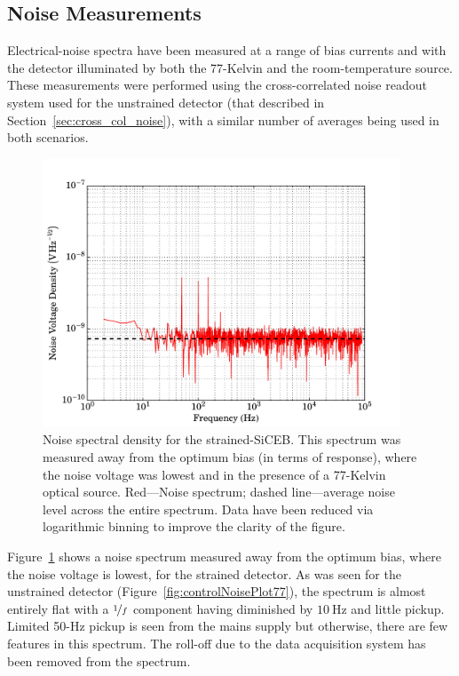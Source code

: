 \subsection{Noise Measurements}\label{ssec:opticalStrainedSi_noise}
Electrical-noise spectra have been measured at a range of bias currents and with the detector illuminated by both the 77-Kelvin and the room-temperature source. These measurements were performed using the cross-correlated noise readout system used for the unstrained detector (that described in Section~\ref{sec:cross_col_noise}), with a similar number of averages being used in both scenarios.
\begin{figure}[tb]
\begin{center}
\includegraphics[width = 0.95\textwidth]{figures/strained_noisePlot77}
\caption[Noise spectrum for the strained-SiCEB]{Noise spectral density for the strained-SiCEB. This spectrum was measured away from the optimum bias (in terms of response), where the noise voltage was lowest and in the presence of a 77-Kelvin optical source. Red---Noise spectrum; dashed line---average noise level across the entire spectrum. Data have been reduced via logarithmic binning to improve the clarity of the figure.}
\label{fig:strainedNoisePlot77}
\end{center}
\end{figure}
\par 
Figure~\ref{fig:strainedNoisePlot77} shows a noise spectrum measured away from the optimum bias, where the noise voltage is lowest, for the strained detector. As was seen for the unstrained detector (Figure~\ref{fig:controlNoisePlot77}), the spectrum is almost entirely flat with a $\nicefrac{1}{f}$ component having diminished by $10~\mathrm{Hz}$ and little pickup. Limited 50-Hz pickup is seen from the mains supply but otherwise, there are few features in this spectrum. The roll-off due to the data acquisition system has been removed from the spectrum.
